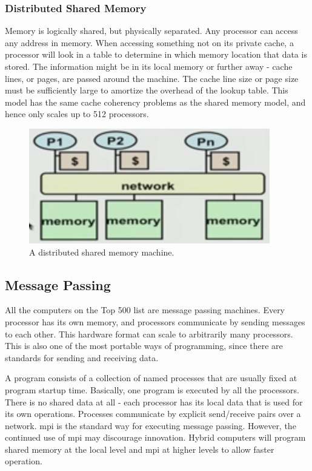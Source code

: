 \documentclass[10pt]{article}
\begin{document}
\begin{flushleft}
\subsubsection{Distributed Shared Memory}

Memory is logically shared, but physically separated. Any processor can access any address in memory. When accessing something not on its private cache, a processor will look in a table to determine in which memory location that data is stored. The information might be in its local memory or further away - cache lines, or pages, are passed around the machine. The cache line size or page size must be sufficiently large to amortize the overhead of the lookup table. This model has the same cache coherency problems as the shared memory model, and hence only scales up to 512 processors. 

\begin{figure}[H]
\centering
\includegraphics[width=0.5\linewidth]{figures/distributed-shared-memory.pdf}
\caption{A distributed shared memory machine.}
\end{figure}

\subsection{Message Passing}

All the computers on the Top 500 list are message passing machines. Every processor has its own memory, and processors communicate by sending messages to each other. This hardware format can scale to arbitrarily many processors. This is also one of the most portable ways of programming, since there are standards for sending and receiving data.

A program consists of a collection of named processes that are usually fixed at program startup time. Basically, one program is executed by all the processors. There is no shared data at all - each processor has its local data that is used for its own operations. Processes communicate by explicit send/receive pairs over a network. \gls{mpi} is the standard way for executing message passing. However, the continued use of \gls{mpi} may discourage innovation. Hybrid computers will program shared memory at the local level and \gls{mpi} at higher levels to allow faster operation.


\end{flushleft}
\end{document}
